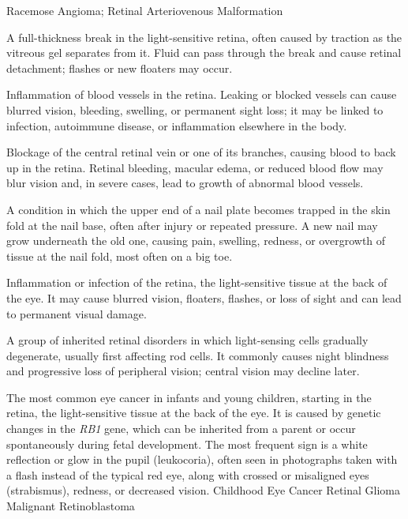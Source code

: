 \synonyms
Racemose Angioma; Retinal Arteriovenous Malformation

 A full-thickness break in the light-sensitive retina, often caused by traction as the vitreous gel separates from it. Fluid can pass through the break and cause retinal detachment; flashes or new floaters may occur.

 Inflammation of blood vessels in the retina. Leaking or blocked vessels can cause blurred vision, bleeding, swelling, or permanent sight loss; it may be linked to infection, autoimmune disease, or inflammation elsewhere in the body.

 Blockage of the central retinal vein or one of its branches, causing blood to back up in the retina. Retinal bleeding, macular edema, or reduced blood flow may blur vision and, in severe cases, lead to growth of abnormal blood vessels.

 A condition in which the upper end of a nail plate
  becomes trapped in the skin fold at the nail base, often after injury
  or repeated pressure. A new nail may grow underneath the old one,
  causing pain, swelling, redness, or overgrowth of tissue at the nail
  fold, most often on a big toe.

 Inflammation or infection of the retina, the light-sensitive tissue at the back of the eye. It may cause blurred vision, floaters, flashes, or loss of sight and can lead to permanent visual damage.

 A group of inherited retinal disorders in which light-sensing cells gradually degenerate, usually first affecting rod cells. It commonly causes night blindness and progressive loss of peripheral vision; central vision may decline later.

 The most common eye cancer in infants and young children, starting in the retina, the light-sensitive tissue at the back of the eye. It is caused by genetic changes in the \textit{RB1} gene, which can be inherited from a parent or occur spontaneously during fetal development. The most frequent sign is a white reflection or glow in the pupil (leukocoria), often seen in photographs taken with a flash instead of the typical red eye, along with crossed or misaligned eyes (strabismus), redness, or decreased vision.
\synonyms
Childhood Eye Cancer
Retinal Glioma
Malignant Retinoblastoma

